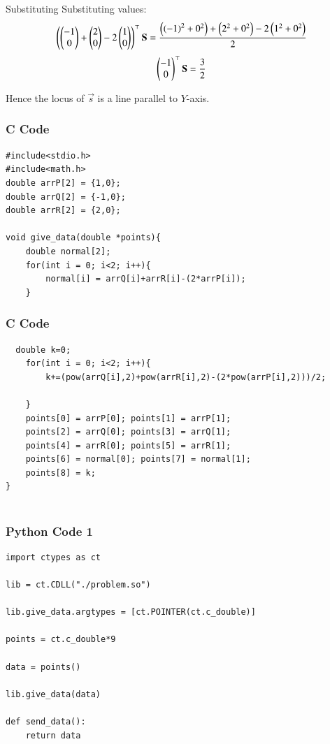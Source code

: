 \documentclass{beamer}
\begin{document}
\begin{frame}{Substituting}
Substituting values:
\begin{align}
    \begin{pmatrix}\begin{pmatrix}-1\\0\end{pmatrix}+\begin{pmatrix}2\\0\end{pmatrix}-2\begin{pmatrix}1\\0\end{pmatrix}\end{pmatrix}^\top\mathbf{S}= \frac{\left(\left(-1\right)^2+0^2\right)+\left(2^2+0^2\right)-2\left(1^2+0^2\right)}{2}
\end{align}
\begin{align}
    \begin{pmatrix}-1\\0\end{pmatrix}^\top\mathbf{S}=\frac{3}{2}
\end{align}

Hence the locus of $\vec{s}$ is a line parallel to $Y$-axis.
\end{frame}

\begin{frame}[fragile]
    \frametitle{C Code}
    \begin{lstlisting}
#include<stdio.h>
#include<math.h>
double arrP[2] = {1,0};
double arrQ[2] = {-1,0};
double arrR[2] = {2,0};

void give_data(double *points){
    double normal[2];
    for(int i = 0; i<2; i++){
        normal[i] = arrQ[i]+arrR[i]-(2*arrP[i]);
    }
    \end{lstlisting}
\end{frame}

\begin{frame}[fragile]
    \frametitle{C Code}
    \begin{lstlisting}
  double k=0;
    for(int i = 0; i<2; i++){
        k+=(pow(arrQ[i],2)+pow(arrR[i],2)-(2*pow(arrP[i],2)))/2;

    }
    points[0] = arrP[0]; points[1] = arrP[1];
    points[2] = arrQ[0]; points[3] = arrQ[1];
    points[4] = arrR[0]; points[5] = arrR[1];
    points[6] = normal[0]; points[7] = normal[1];
    points[8] = k;
}
 
    \end{lstlisting}
\end{frame}

\begin{frame}[fragile]
    \frametitle{Python Code 1}
    \begin{lstlisting}
import ctypes as ct

lib = ct.CDLL("./problem.so")

lib.give_data.argtypes = [ct.POINTER(ct.c_double)]

points = ct.c_double*9

data = points()

lib.give_data(data)

def send_data():
    return data
    \end{lstlisting}
\end{frame}
\end{document}
